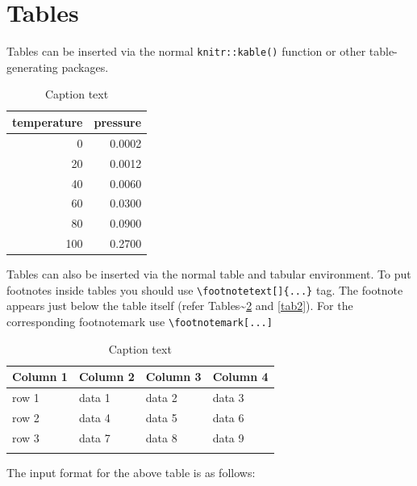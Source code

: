 \documentclass[sn-basic,pdflatex]{sn-jnl}
\theoremstyle{remark}
\theoremstyle{definition}
\begin{document}
\section{Tables}\label{sec5}

Tables can be inserted via the normal \texttt{knitr::kable()} function
or other table-generating packages.

\begin{table}

\caption{\label{tab:tab1}Caption text}
\centering
\begin{tabular}[t]{r|r}
\hline
temperature & pressure\\
\hline
0 & 0.0002\\
\hline
20 & 0.0012\\
\hline
40 & 0.0060\\
\hline
60 & 0.0300\\
\hline
80 & 0.0900\\
\hline
100 & 0.2700\\
\hline
\end{tabular}
\end{table}

Tables can also be inserted via the normal table and tabular
environment. To put footnotes inside tables you should use
\texttt{\textbackslash{}footnotetext{[}{]}\{...\}} tag. The footnote
appears just below the table itself (refer
Tables\textasciitilde{}\ref{tab1} and \ref{tab2}). For the corresponding
footnotemark use \texttt{\textbackslash{}footnotemark{[}...{]}}

\begin{table}[h]
\caption{Caption text}\label{tab1}%
\begin{tabular}{@{}llll@{}}
\toprule
Column 1 & Column 2  & Column 3 & Column 4\\
\midrule
row 1    & data 1   & data 2  & data 3  \\
row 2    & data 4   & data 5\footnotemark[1]  & data 6  \\
row 3    & data 7   & data 8  & data 9\footnotemark[2]  \\
\botrule
\end{tabular}
\end{table}

\noindent The input format for the above table is as follows:
\end{document}
